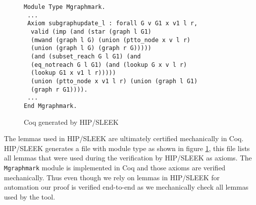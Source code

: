 \begin{figure}[t]
  \begin{lstlisting}
Module Type Mgraphmark.
 ...
 Axiom subgraphupdate_l : forall G v G1 x v1 l r,
  valid (imp (and (star (graph l G1)
  (mwand (graph l G) (union (ptto_node x v l r)
  (union (graph l G) (graph r G)))))
  (and (subset_reach G l G1) (and
  (eq_notreach G l G1) (and (lookup G x v l r)
  (lookup G1 x v1 l r)))))
  (union (ptto_node x v1 l r) (union (graph l G1)
  (graph r G1)))).
 ...
End Mgraphmark.
\end{lstlisting}
\caption{Coq  generated by HIP/SLEEK}
\label{fig:hipcoqfile}
\end{figure}

The lemmas used in HIP/SLEEK are ultimately certified mechanically in Coq. HIP/SLEEK generates a file with module type as shown in figure \ref{fig:hipcoqfile}, this file lists all lemmas that were used during the verification by HIP/SLEEK as axioms. The \texttt{Mgraphmark} module is implemented in Coq and those axioms are verified mechanically. Thus even though we rely on lemmas in HIP/SLEEK for automation our proof is verified end-to-end as we mechanically check all lemmas used by the tool. 